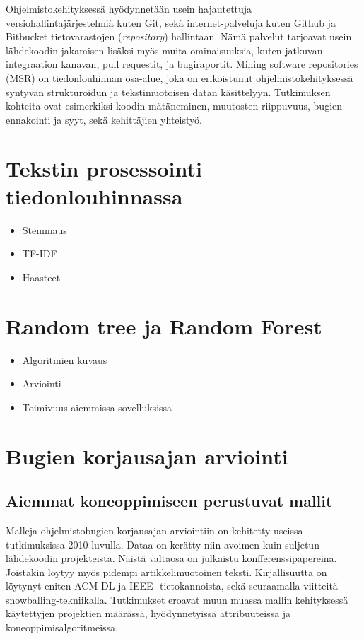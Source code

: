 \documentclass[utf8]{gradu3}
\begin{document}
Ohjelmistokehityksessä hyödynnetään usein hajautettuja
versiohallintajärjestelmiä kuten Git, sekä internet-palveluja kuten Github ja
Bitbucket tietovarastojen (\textit{repository}) hallintaan. Nämä palvelut
tarjoavat usein lähdekoodin jakamisen lisäksi myös muita ominaisuuksia, kuten
jatkuvan integraation kanavan, pull requestit, ja bugiraportit. Mining software
repositories (MSR) on tiedonlouhinnan osa-alue, joka on erikoistunut
ohjelmistokehityksessä syntyvän strukturoidun ja tekstimuotoisen datan
käsittelyyn. Tutkimuksen kohteita ovat esimerkiksi koodin mätäneminen, muutosten
riippuvuus, bugien ennakointi ja syyt, sekä kehittäjien yhteistyö.
\parencite{guemes-pena-emerging_topics}

\section{Tekstin prosessointi tiedonlouhinnassa}
 \begin{itemize}
   \item Stemmaus
   \item TF-IDF
   \item Haasteet
 \end{itemize}
\section{Random tree ja Random Forest}
\begin{itemize}
  \item Algoritmien kuvaus
  \item Arviointi
  \item Toimivuus aiemmissa sovelluksissa
\end{itemize}

\section{Bugien korjausajan arviointi}


\subsection{Aiemmat koneoppimiseen perustuvat mallit}
Malleja ohjelmistobugien korjausajan arviointiin on kehitetty useissa
tutkimuksissa 2010-luvulla. Dataa on kerätty niin avoimen kuin suljetun
lähdekoodin projekteista. Näistä valtaosa on julkaistu konfferenssipapereina.
Joistakin löytyy myös pidempi artikkelimuotoinen teksti. Kirjallisuutta on
löytynyt eniten ACM DL ja IEEE -tietokannoista, sekä seuraamalla viitteitä
snowballing-tekniikalla. Tutkimukset eroavat muun muassa mallin kehityksessä
käytettyjen projektien määrässä, hyödynnetyissä attribuuteissa ja
koneoppimisalgoritmeissa.
\end{document}
